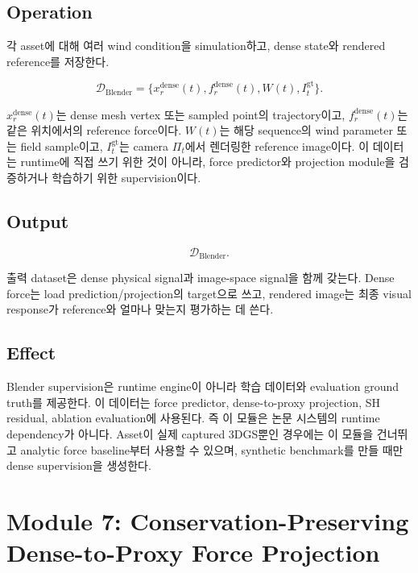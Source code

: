 \documentclass[11pt,a4paper]{article}
\begin{document}
\subsection*{Operation}

각 asset에 대해 여러 wind condition을 simulation하고, dense state와 rendered reference를 저장한다.

\begin{equation}
\mathcal{D}_{\mathrm{Blender}}=\{x_r^{\mathrm{dense}}(t),f_r^{\mathrm{dense}}(t),W(t),I_t^{\mathrm{gt}}\}.
\end{equation}

$x_r^{\mathrm{dense}}(t)$는 dense mesh vertex 또는 sampled point의 trajectory이고, $f_r^{\mathrm{dense}}(t)$는 같은 위치에서의 reference force이다.
$W(t)$는 해당 sequence의 wind parameter 또는 field sample이고, $I_t^{\mathrm{gt}}$는 camera $\Pi_t$에서 렌더링한 reference image이다.
이 데이터는 runtime에 직접 쓰기 위한 것이 아니라, force predictor와 projection module을 검증하거나 학습하기 위한 supervision이다.

\subsection*{Output}

\begin{equation}
\mathcal{D}_{\mathrm{Blender}}.
\end{equation}

출력 dataset은 dense physical signal과 image-space signal을 함께 갖는다.
Dense force는 load prediction/projection의 target으로 쓰고, rendered image는 최종 visual response가 reference와 얼마나 맞는지 평가하는 데 쓴다.

\subsection*{Effect}

Blender supervision은 runtime engine이 아니라 학습 데이터와 evaluation ground truth를 제공한다. 이 데이터는 force predictor, dense-to-proxy projection, SH residual, ablation evaluation에 사용된다.
즉 이 모듈은 논문 시스템의 runtime dependency가 아니다.
Asset이 실제 captured 3DGS뿐인 경우에는 이 모듈을 건너뛰고 analytic force baseline부터 사용할 수 있으며, synthetic benchmark를 만들 때만 dense supervision을 생성한다.

\section{Module 7: Conservation-Preserving Dense-to-Proxy Force Projection}
\end{document}
